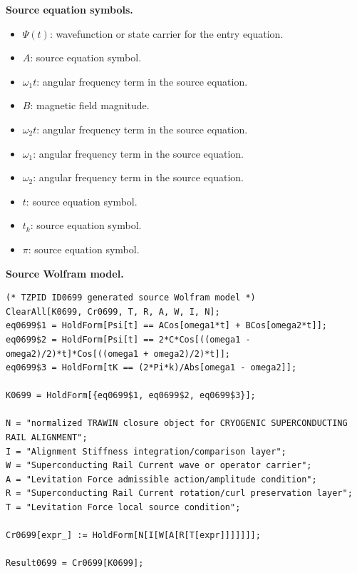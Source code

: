 \begin{minipage}[t]{0.49\linewidth}
\begingroup
\small
\raggedright
\textbf{Source equation symbols.}\par
\begin{itemize}[leftmargin=1.35em,itemsep=1pt,topsep=1pt,parsep=0pt]
    \item $\Psi(t)$: wavefunction or state carrier for the entry equation.
    \item $A$: source equation symbol.
    \item $\omega_1t$: angular frequency term in the source equation.
    \item $B$: magnetic field magnitude.
    \item $\omega_2t$: angular frequency term in the source equation.
    \item $\omega_1$: angular frequency term in the source equation.
    \item $\omega_2$: angular frequency term in the source equation.
    \item $t$: source equation symbol.
    \item $t_k$: source equation symbol.
    \item $\pi$: source equation symbol.
\end{itemize}
\endgroup
\end{minipage}\hfill
\begin{minipage}[t]{0.47\linewidth}
\begingroup
\scriptsize
\raggedright
\textbf{Source Wolfram model.}\par
\begin{Verbatim}[fontsize=\tiny,breaklines=true,breakanywhere=true]
(* TZPID ID0699 generated source Wolfram model *)
ClearAll[K0699, Cr0699, T, R, A, W, I, N];
eq0699$1 = HoldForm[Psi[t] == ACos[omega1*t] + BCos[omega2*t]];
eq0699$2 = HoldForm[Psi[t] == 2*C*Cos[((omega1 - omega2)/2)*t]*Cos[((omega1 + omega2)/2)*t]];
eq0699$3 = HoldForm[tK == (2*Pi*k)/Abs[omega1 - omega2]];

K0699 = HoldForm[{eq0699$1, eq0699$2, eq0699$3}];

N = "normalized TRAWIN closure object for CRYOGENIC SUPERCONDUCTING RAIL ALIGNMENT";
I = "Alignment Stiffness integration/comparison layer";
W = "Superconducting Rail Current wave or operator carrier";
A = "Levitation Force admissible action/amplitude condition";
R = "Superconducting Rail Current rotation/curl preservation layer";
T = "Levitation Force local source condition";

Cr0699[expr_] := HoldForm[N[I[W[A[R[T[expr]]]]]]];

Result0699 = Cr0699[K0699];
\end{Verbatim}
\endgroup
\end{minipage}

